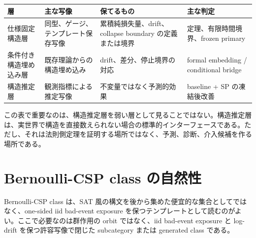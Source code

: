 \documentclass[12pt,a4paper]{article}
\begin{document}
{\def\LTcaptype{table} %
\begin{longtable}[]{@{}
  >{\raggedright\arraybackslash}p{}
  >{\raggedright\arraybackslash}p{}
  >{\raggedright\arraybackslash}p{}
  >{\raggedright\arraybackslash}p{}@{}}
\toprule\noalign{}
\begin{minipage}[b]{\linewidth}\raggedright
層
\end{minipage} & \begin{minipage}[b]{\linewidth}\raggedright
主な写像
\end{minipage} & \begin{minipage}[b]{\linewidth}\raggedright
保てるもの
\end{minipage} & \begin{minipage}[b]{\linewidth}\raggedright
主な判定
\end{minipage} \\
\midrule\noalign{}
\endhead
\bottomrule\noalign{}
\endlastfoot
仕様固定構造層 & 同型、ゲージ、テンプレート保存写像 & 累積純損失量、drift、collapse boundary の定義または境界 & 定理、有限時間境界、frozen primary \\
条件付き構造埋め込み層 & 既存理論からの構造埋め込み & drift、差分、停止境界の対応 & formal embedding / conditional bridge \\
構造推定層 & 観測指標による推定写像 & 不変量ではなく予測的効果 & baseline + SP の凍結後改善 \\
\end{longtable}
}

この表で重要なのは、構造推定層を弱い層として見ることではない。構造推定層は、実世界で構造を直接数えられない場合の標準的インターフェースである。ただし、それは法則側定理を証明する場所ではなく、予測、診断、介入候補を作る場所である。

\section{Bernoulli-CSP class の自然性}\label{bernoulli-csp-class-ux306eux81eaux7136ux6027}

Bernoulli-CSP class は、SAT 風の構文を後から集めた便宜的な集合としてではなく、one-sided iid bad-event exposure を保つテンプレートとして読むのがよい。ここで必要なのは群作用の orbit ではなく、iid bad-event exposure と log-drift を保つ許容写像で閉じた subcategory または generated class である。
\end{document}
